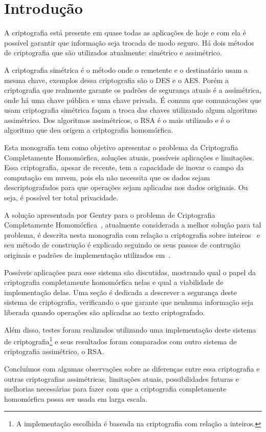 \chapter{Introdução}
\label{introducao}
A criptografia está presente em quase todas as aplicações de hoje e com ela é possível garantir que informação seja trocada de modo seguro. Há dois métodos de criptografia que são utilizados atualmente: simétrico e assimétrico.

A criptografia simétrica é o método onde o remetente e o destinatário usam a mesma chave, exemplos dessa criptografia são o DES e o AES. Porém a criptografia que realmente garante os padrões de segurança atuais é a assimétrica, onde há uma chave pública e uma chave privada. É comum que comunicações que usam criptografia simétrica façam a troca das chaves utilizando algum algoritmo assimétrico. Dos algoritmos assimétricos, o RSA é o mais utilizado e é o algoritmo que deu origem a criptografia homomórfica.

Esta monografia tem como objetivo apresentar o problema da Criptografia Completamente Homomórfica, soluções atuais, possíveis aplicações e limitações.
Essa criptografia, apesar de recente, tem a capacidade de inovar o campo da computação em nuvem, pois ela não necessita que os dados sejam descriptografados para que operações sejam aplicadas nos dados originais. Ou seja, é possível ter total privacidade.

A solução apresentada por Gentry para o problema de Criptografia Completamente Homomórfica~\cite{gentrythesis}, atualmente considerada a melhor solução para tal problema, é descrita nesta monografia com relação a criptografia sobre inteiros~\cite{fheintegers} e seu método de construção é explicado seguindo os seus passos de contrução originais e padrões de implementação utilizados em~\cite{gentryhalevi}.

Possíveis aplicações para esse sistema são discutidas, mostrando qual o papel da criptografia completamente homomórfica nelas e qual a viabilidade de implementação delas.
Uma seção é dedicada a descrever a segurança deste sistema de criptografia, verificando o que garante que nenhuma informação seja liberada quando operações são aplicadas ao texto criptografado.

Além disso, testes foram realizados utilizando uma implementação deste sistema de criptografia\footnote{A implementação escolhida é baseada na criptografia com relação a inteiros.} e seus resultados foram comparados com outro sistema de criptografia assimétrico, o RSA.

Concluímos com algumas observações sobre as diferenças entre essa criptografia e outras criptografias assimétricas, limitações atuais, possibilidades futuras e melhorias necessárias para fazer com que a criptografia completamente homomórfica possa ser usada em larga escala.